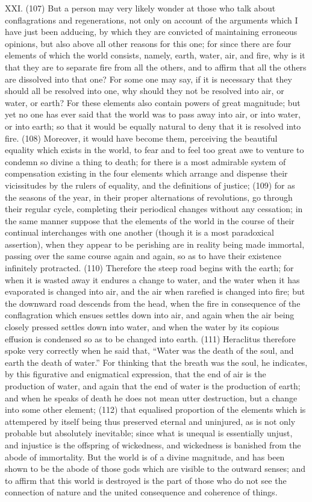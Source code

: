 XXI. (107) But a person may very likely wonder at those who talk about conflagrations and
regenerations, not only on account of the arguments which I have just been adducing, by which
they are convicted of maintaining erroneous opinions, but also above all other reasons for this
one; for since there are four elements of which the world consists, namely, earth, water, air, and
fire, why is it that they are to separate fire from all the others, and to affirm that all the others are
dissolved into that one? For some one may say, if it is necessary that they should all be resolved
into one, why should they not be resolved into air, or water, or earth? For these elements also
contain powers of great magnitude; but yet no one has ever said that the world was to pass away
into air, or into water, or into earth; so that it would be equally natural to deny that it is resolved into
fire. (108) Moreover, it would have become them, perceiving the beautiful equality which exists in
the world, to fear and to feel too great awe to venture to condemn so divine a thing to death; for
there is a most admirable system of compensation existing in the four elements which arrange and
dispense their vicissitudes by the rulers of equality, and the definitions of justice; (109) for as the
seasons of the year, in their proper alternations of revolutions, go through their regular cycle,
completing their periodical changes without any cessation; in the same manner suppose that the
elements of the world in the course of their continual interchanges with one another (though it is a
most paradoxical assertion), when they appear to be perishing are in reality being made immortal,
passing over the same course again and again, so as to have their existence infinitely protracted.
(110) Therefore the steep road begins with the earth; for when it is wasted away it endures a
change to water, and the water when it has evaporated is changed into air, and the air when
rarefied is changed into fire; but the downward road descends from the head, when the fire in
consequence of the conflagration which ensues settles down into air, and again when the air being
closely pressed settles down into water, and when the water by its copious effusion is condensed
so as to be changed into earth. (111) Heraclitus therefore spoke very correctly when he said that,
``Water was the death of the soul, and earth the death of water.'' For thinking that the breath was
the soul, he indicates, by this figurative and enigmatical expression, that the end of air is the
production of water, and again that the end of water is the production of earth; and when he speaks
of death he does not mean utter destruction, but a change into some other element; (112) that
equalised proportion of the elements which is attempered by itself being thus preserved eternal
and uninjured, as is not only probable but absolutely inevitable; since what is unequal is essentially
unjust, and injustice is the offspring of wickedness, and wickedness is banished from the abode of
immortality. But the world is of a divine magnitude, and has been shown to be the abode of those
gods which are visible to the outward senses; and to affirm that this world is destroyed is the part
of those who do not see the connection of nature and the united consequence and coherence of
things.

